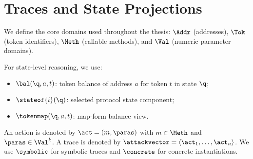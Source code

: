 \section{Traces and State Projections}

We define the core domains used throughout the thesis:
$\Addr$ (addresses), $\Tok$ (token identifiers), $\Meth$ (callable methods), and $\Val$ (numeric parameter domains).

For state-level reasoning, we use:
\begin{itemize}
    \item $\bal(\q,a,t)$: token balance of address $a$ for token $t$ in state $\q$;
    \item $\stateof{i}(\q)$: selected protocol state component;
    \item $\tokenmap(\q,a,t)$: map-form balance view.
\end{itemize}

An action is denoted by $\act=(m,\paras)$ with $m \in \Meth$ and $\paras \in \Val^k$.
A trace is denoted by $\attackvector=\langle \act_1,\ldots,\act_n\rangle$.
We use $\symbolic$ for symbolic traces and $\concrete$ for concrete instantiations.
